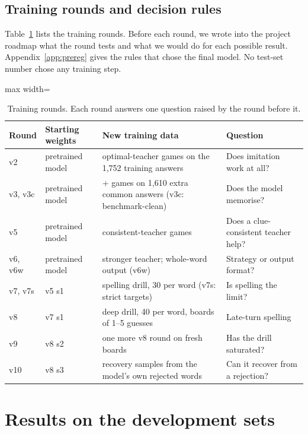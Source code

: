 \documentclass{article}
\begin{document}
\subsection{Training rounds and decision rules}
\label{sec:rounds}
Table~\ref{tab:rounds} lists the training rounds.
Before each round, we wrote into the project roadmap what the round tests and what we would do for each possible result.
Appendix~\ref{app:prereg} gives the rules that chose the final model.
No test-set number chose any training step.

\begin{table}[htbp]
\centering\small
\caption{Training rounds. Each round answers one question raised by the round before it.}
\label{tab:rounds}
\begin{adjustbox}{max width=\linewidth}
\begin{tabular}{llll}
\toprule
Round & Starting weights & New training data & Question \\
\midrule
v2 & pretrained model & optimal-teacher games on the 1,752 training answers & Does imitation work at all? \\
v3, v3c & pretrained model & + games on 1,610 extra common answers (v3c: benchmark-clean) & Does the model memorise? \\
v5 & pretrained model & consistent-teacher games & Does a clue-consistent teacher help? \\
v6, v6w & pretrained model & stronger teacher; whole-word output (v6w) & Strategy or output format? \\
v7, v7s & v5 s1 & spelling drill, 30 per word (v7s: strict targets) & Is spelling the limit? \\
v8 & v7 s1 & deep drill, 40 per word, boards of 1--5 guesses & Late-turn spelling \\
v9 & v8 s2 & one more v8 round on fresh boards & Has the drill saturated? \\
v10 & v8 s3 & recovery samples from the model's own rejected words & Can it recover from a rejection? \\
\bottomrule
\end{tabular}\end{adjustbox}
\end{table}

\section{Results on the development sets}
\label{sec:results}
\end{document}
